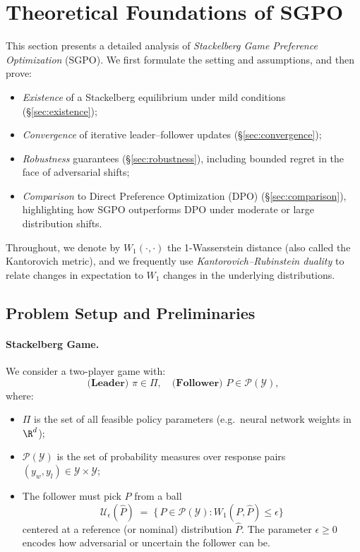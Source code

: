 \section{Theoretical Foundations of SGPO}
\label{sec:theory}

This section presents a detailed analysis of \emph{Stackelberg Game Preference Optimization} (SGPO).  We first formulate the setting and assumptions, and then prove:
\begin{itemize}
  \item \emph{Existence} of a Stackelberg equilibrium under mild conditions (\S\ref{sec:existence});
  \item \emph{Convergence} of iterative leader--follower updates (\S\ref{sec:convergence});
  \item \emph{Robustness} guarantees (\S\ref{sec:robustness}), including bounded regret in the face of adversarial shifts;
  \item \emph{Comparison} to Direct Preference Optimization (DPO) (\S\ref{sec:comparison}), highlighting how SGPO outperforms DPO under moderate or large distribution shifts.
\end{itemize}

Throughout, we denote by $W_1(\cdot,\cdot)$ the 1-Wasserstein distance (also called the Kantorovich metric), and we frequently use \emph{Kantorovich--Rubinstein duality} \cite{villani2003topics, peyre2019computational} to relate changes in expectation to $W_1$ changes in the underlying distributions.

\subsection{Problem Setup and Preliminaries}
\label{sec:setup}

\paragraph{Stackelberg Game.}
We consider a two-player game with:
\[
\textbf{(Leader) } \pi \in \Pi,
\quad
\textbf{(Follower) } P \in \mathcal{P}(\mathcal{Y}),
\]
where:
\begin{itemize}
\item $\Pi$ is the set of all feasible policy parameters (e.g.\ neural network weights in $\R^d$);
\item $\mathcal{P}(\mathcal{Y})$ is the set of probability measures over response pairs $(y_w,y_l)\in \mathcal{Y}\times \mathcal{Y}$; 
\item The follower must pick $P$ from a ball
\[
\mathcal{U}_\epsilon(\hat{P}) \;=\; \bigl\{\,P\in \mathcal{P}(\mathcal{Y}):W_1(P,\hat{P})\le \epsilon \bigr\}
\]
centered at a reference (or nominal) distribution $\hat{P}$.  The parameter $\epsilon\ge 0$ encodes how adversarial or uncertain the follower can be.
\end{itemize}

